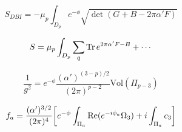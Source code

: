 \begin{equation}
  S_{DBI} = -\mu_p \int_{D_p} e^{-\phi}\sqrt{\det (G+B-2\pi \alpha' F)}
\end{equation}

\begin{equation}
  S = \mu_p \int_{D_p} \sum_q \Tr e^{2\pi \alpha' F-B}+\cdots
\end{equation}

\begin{equation}
  \frac{1}{g^2}=e^{-\phi}\frac{(\alpha')^{(3-p)/2}}{(2\pi)^{p-2}}\mathrm{Vol}(\Pi_{p-3})
\end{equation}

\begin{equation}
  f_a = \frac{(\alpha')^{3/2}}{(2\pi)^4}\qty[e^{-\phi}\int_{\Pi_a}\Re(e^{-i\phi_a}\Omega_3)+ i\int_{\Pi_a}c_3]
\end{equation}
